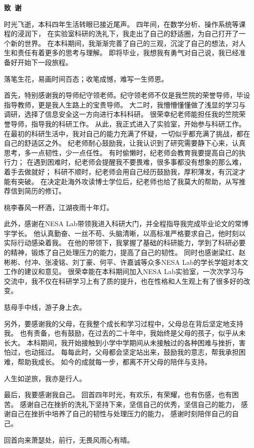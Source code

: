 \cleardoublepage{}
\begin{center}
    \bfseries {} 致~谢
\end{center}

时光飞逝，本科四年生活转眼已接近尾声。
四年间，在数学分析、操作系统等课程的浸润下，
在实验室科研的洗礼下，我走出了自己的舒适圈，为自己打开了一个新的世界。
在本科期间，我渐渐完善了自己的三观，沉淀了自己的想法，对人生和责任有着更多的思考与理解。
即将毕业，我想我有勇气对自己说，我已经准备好开始下一段旅程。

落笔生花，易画时间百态；收笔成憾，难写一生师恩。

首先，特别感谢我的导师纪守领老师。纪守领老师不仅是我竺院的荣誉导师，毕设指导教师，更是我人生路上的宝贵导师。
大二时，我懵懵懂懂做了浅显的学习与调研，选择了信息安全这一方向进行本科科研。
很荣幸纪老师能担任我的竺院荣誉导师，指导我的科研工作。
从此，我正式进入了实验室，开始参与科研工作。
在最初的科研生活中，我对自己的能力充满了怀疑，一切似乎都充满了挑战，都在自己的舒适区之外。
纪老师耐心鼓励我，让我认识到了研究需要静下心来，认真思考，多一点韧性，少一点任性。
有时偷懒时，纪老师会教育我要提高自己的执行力；
在遇到困难时，纪老师会提醒我不要畏难，很多事都没有想象的那么难，着手去做就好；
科研不顺时，纪老师会用自己经历鼓励我，厚积薄发，有沉淀才能有突破。
在决定赴海外攻读博士学位后，纪老师也给了我莫大的帮助，从写推荐信到简历的修订。

桃李春风一杯酒，江湖夜雨十年灯。

此外，感谢在NESA Lab带领我进入科研大门，并全程指导我完成毕业论文的常博宇学长。
他认真勤奋、一丝不苟、头脑清晰，以高标准严格要求自己，他时刻以实际行动感染着我。
在他的带领下，我掌握了基础的科研能力，学到了科研必要的精神，锻炼了自己处理压力的能力，提高了自己的韧性。
同时也感谢梁红、赵彬彬、付冲、张凌铭、刘丁豪、何平、许嘉诚等众多NESA Lab的学长学姐对本文工作的建议和意见。
很荣幸能在本科期间加入NESA Lab实验室，一次次学习与交流中，我不仅在科研学习上有了质的提升，也在性格和人生观上有了很多好的改变。

慈母手中线，游子身上衣。

另外，要感谢我的父母，在我整个成长和学习过程中，父母总在背后坚定地支持我。
也有责备，也有鼓励，在过去的二十年中，我始终是父母的孩子，似乎从未长大。
本科期间，我开始接触到小学中学期间从未接触过的各种困难与挫折，害怕过，也动摇过。
每每此时，父母都会坚定站出来，鼓励我的意志，帮我承担困难，帮助我成长。
如今的成就每一步，都离不开父母的陪伴与支持。

人生如逆旅，我亦是行人。

最后，我要感谢我自己。
回首四年时光，有欢乐，有荣耀，也有伤感，也有困苦。
感谢自己在挫折的洗礼下坚持下来，坚信自己的优秀，坚信自己的能力，
感谢自己在挫折中培养了自己的韧性与处理压力的能力，
感谢时刻陪伴自己的自己。

回首向来萧瑟处，前行，无畏风雨心有晴。

